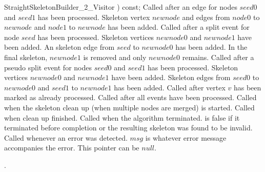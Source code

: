 \begin{ccRefConcept}{StraightSkeletonBuilder_2_Visitor}
{                                      )  const;} 
         {Called after an edge for nodes $seed0$ and $seed1$ has been processed.
          Skeleton vertex $newnode$ and edges from $node0$ to $newnode$ and $node1$ to $newnode$
          has been added.}
\ccGlue
{}
         {Called after a split event for node $seed$ has been processed.
          Skeleton vertices  $newnode0$ and $newnode1$ have been added. 
          An skeleton edge from $seed$ to $newnode0$ has been added.
          In the final skeleton, $newnode1$ is removed and only $newnode0$ remains.}
\ccGlue
{}
         {Called after a pseudo split event for nodes $seed0$ and $seed1$ has been processed.
          Skeleton vertices  $newnode0$ and $newnode1$ have been added. 
          Skeleton edges from $seed0$ to $newnode0$ and $seed1$ to $newnode1$ has been added.}
\ccGlue
{}
         {Called after vertex $v$ has been marked as already processed.}
\ccGlue
{}
         {Called after all events have been processed.}
\ccGlue
{}
         {Called when the skeleton clean up (when multiple nodes are merged) is started.}
\ccGlue
{}
         {Called when clean up finished.}
\ccGlue
{}
         {Called when the algorithm terminated.
          is false if it terminated before completion or the resulting skeleton 
         was found to be invalid.}
\ccGlue
{}
         {Called whenever an error was detected.
          $msg$ is whatever error message accompanies the error. This pointer can be $null$.}

\ccHasModels

.

\ccSeeAlso


\end{ccRefConcept}

